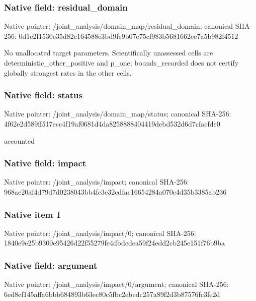 \documentclass[10pt,a4paper]{article}
\begin{document}
\subsubsection{Native field: residual\_\allowbreak{}domain}
Native pointer: /joint\_\allowbreak{}analysis/domain\_\allowbreak{}map/residual\_\allowbreak{}domain; canonical SHA-256: 0d1e2f1530e35d82c164588e3bd9fc9b07e75cf983b5681662ee7a5b982f4512

\begingroup\raggedright\sloppy No unallocated target parameters. Scientifically unassessed cells are deterministic\_\allowbreak{}other\_\allowbreak{}positive and p\_\allowbreak{}one;\allowbreak{} bounds\_\allowbreak{}recorded does not certify globally strongest rates in the other cells.\par\endgroup

\subsubsection{Native field: status}
Native pointer: /joint\_\allowbreak{}analysis/domain\_\allowbreak{}map/status; canonical SHA-256: 4f62e2d589ff517ecc4f19af0681d4da8258888404419debd532d6d7cfaefde0

\begingroup\raggedright\sloppy accounted\par\endgroup

\subsubsection{Native field: impact}
Native pointer: /joint\_\allowbreak{}analysis/impact; canonical SHA-256: 968ae20af4d79d7d0238043bb4fc3e32cdfac16654284a070c4d35b3385ab236

\subsubsection{Native item 1}
Native pointer: /joint\_\allowbreak{}analysis/impact/0; canonical SHA-256: 1840e9e25b9300e95426d22f55279fe4dbdcdea59f24edd2cb245e151f76b9ba

\subsubsection{Native field: argument}
Native pointer: /joint\_\allowbreak{}analysis/impact/0/argument; canonical SHA-256: 6ed8ef145affa6bbb684893b63ec80c5fbc2ebedc257a89f2d3b87576fc3fe2d
\end{document}

